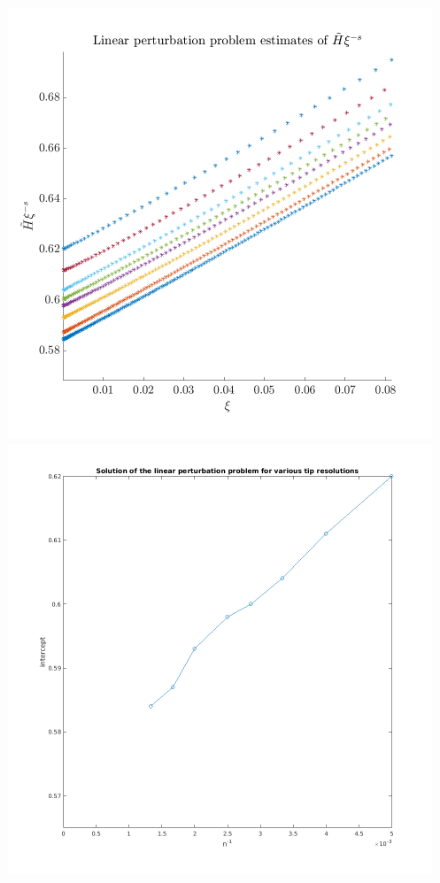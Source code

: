 \documentclass{article}
\begin{document}
\begin{figure}[!ht]\centering
\includegraphics[scale=0.5]{linear-perturbation.png}
\includegraphics[scale=0.45]{resolution-effect.png}
\end{figure}
\end{document}

